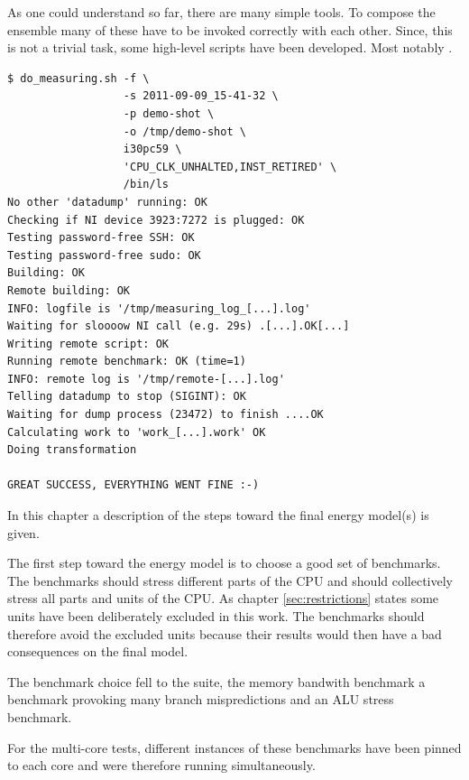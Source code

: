 As one could understand so far, there are many simple tools. To compose
the ensemble many of these have to be invoked correctly with each other. Since,
this is not a trivial task, some high-level scripts have been developed. Most
notably \JWTdomeasuring{}.

\begin{lstlisting}[style=Shell]
$ do_measuring.sh -f \
                  -s 2011-09-09_15-41-32 \
                  -p demo-shot \
                  -o /tmp/demo-shot \
                  i30pc59 \
                  'CPU_CLK_UNHALTED,INST_RETIRED' \
                  /bin/ls
No other 'datadump' running: OK
Checking if NI device 3923:7272 is plugged: OK
Testing password-free SSH: OK
Testing password-free sudo: OK
Building: OK
Remote building: OK
INFO: logfile is '/tmp/measuring_log_[...].log'
Waiting for sloooow NI call (e.g. 29s) .[...].OK[...]
Writing remote script: OK
Running remote benchmark: OK (time=1)
INFO: remote log is '/tmp/remote-[...].log'
Telling datadump to stop (SIGINT): OK
Waiting for dump process (23472) to finish ....OK
Calculating work to 'work_[...].work' OK
Doing transformation

GREAT SUCCESS, EVERYTHING WENT FINE :-)
\end{lstlisting}


\label{sec:towards-the-model}

In this chapter a description of the steps toward the final energy model(s) is
given.


\label{sec:benchmarks}

The first step toward the energy model is to choose a good set of benchmarks.
The benchmarks should stress different parts of the CPU and should collectively
stress all parts and units of the CPU. As chapter \ref{sec:restrictions} states
some units have been deliberately excluded in this work. The benchmarks should
therefore avoid the excluded units because their results would then have a bad
consequences on the final model.

The benchmark choice fell to the \JWTLspec{} suite, the memory bandwith
benchmark \JWTLstream{} a benchmark provoking many branch mispredictions
and an ALU stress benchmark.

For the multi-core tests, different instances of these benchmarks have been
pinned to each core and were therefore running simultaneously.


